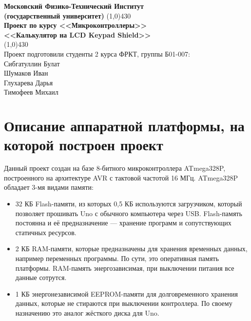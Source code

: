 \documentclass[a4paper, 12pt]{article}%
\begin{document}
\begin{titlepage}

\begin{center}
\large\textbf{Московский Физико-Технический Институт}\\
\large\textbf{(государственный университет)}
\vfill
\line(1,0){430}\\[1mm]
\huge\textbf{Проект по курсу <<Микроконтроллеры>>}\\
\huge\textbf{<<Калькулятор на LCD Keypad Shield>>}\\
\line(1,0){430}\\[1mm]
\vfill
\large Проект подготовили студенты 2 курса ФРКТ, группы Б01-007:\\
\large Сибгатуллин Булат\\
\large Шумаков Иван\\
\large Глухарева Дарья\\
\large Тимофеев Михаил\\
\end{center}

\end{titlepage}

\tableofcontents{} %
\newpage

\section{Описание аппаратной платформы, на которой построен проект}

Данный проект создан на базе 8-битного микроконтроллера ATmega328P, построенного на архитектуре AVR с тактовой частотой 16 МГц. ATmega328P обладает 3-мя видами памяти:
\begin{itemize}
\item 32 КБ Flash-памяти, из которых 0,5 КБ используются загрузчиком, который позволяет прошивать Uno с обычного компьютера через USB. Flash-память постоянна и её предназначение — хранение программ и сопутствующих статичных ресурсов.

\item 2 КБ RAM-памяти, которые предназначены для хранения временных данных, например переменных программы. По сути, это оперативная память платформы. RAM-память энергозависимая, при выключении питания все данные сотрутся.

\item 1 КБ энергонезависимой EEPROM-памяти для долговременного хранения данных, которые не стираются при выключении контроллера. По своему назначению это аналог жёсткого диска для Uno.
\end{itemize}
\end{document}

